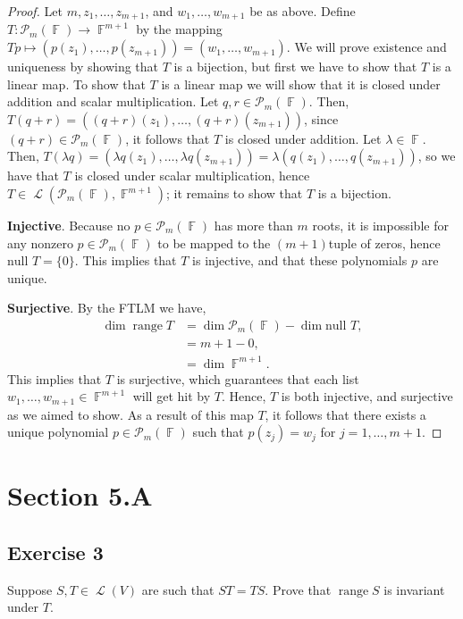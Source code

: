 \documentclass[letterpaper, 12pt]{amsart}
\DeclareMathOperator{\F}{\mathbb{F}}				%
\DeclareMathOperator{\Ell}{\mathscr{L}}				%
\renewcommand{\null}{\text{null }}					%
\DeclareMathOperator{\range}{\text{range }}			%
\theoremstyle{definition}  							%
\begin{document}
		\begin{proof}
		Let $m, z_{1}, \dots, z_{m+1}$, and $w_{1}, \dots, w_{m+1}$ be as above.
		Define $T : \mathcal{P}_{m}(\F) \to \F^{m+1}$ by the mapping $Tp \mapsto (p(z_{1}), \dots, p(z_{m+1})) = (w_{1}, \dots, w_{m+1})$.
		We will prove existence and uniqueness by showing that $T$ is a bijection, but first we have to show that $T$ is a linear map.
		To show that $T$ is a linear map we will show that it is closed under addition and scalar multiplication.
		Let $q,r \in \mathcal{P}_{m}(\F)$.
		Then, $T(q+r) = ((q+r)(z_{1}), \dots, (q+r)(z_{m+1}))$, since $(q+r) \in \mathcal{P}_{m}(\F)$, it follows that $T$ is closed under addition.
		Let $\lambda \in \F$.
		Then, $T(\lambda q) = (\lambda q(z_{1}), \dots, \lambda q(z_{m+1})) = \lambda (q(z_{1}), \dots, q(z_{m+1}))$, so we have that $T$ is closed under scalar multiplication, hence $T \in \Ell(\mathcal{P}_{m}(\F), \F^{m+1})$; it remains to show that $T$ is a bijection.

		\textbf{Injective}.
		Because no $p \in \mathcal{P}_{m}(\F)$ has more than $m$ roots, it is impossible for any nonzero $p \in \mathcal{P}_{m}(\F)$ to be mapped to the $(m+1)$tuple of zeros, hence $\null T = \{ 0 \}$.
		This implies that $T$ is injective, and that these polynomials $p$ are unique.

		\textbf{Surjective}.
		By the FTLM we have,
		\begin{align*}
			\dim \range T &= \dim \mathcal{P}_{m}(\F) - \dim \null T, \\
			&= m + 1 - 0, \\
			&= \dim \F^{m+1}.
		\end{align*}
		This implies that $T$ is surjective, which guarantees that each list $w_{1},\dots,w_{m+1} \in \F^{m+1}$ will get hit by $T$.
		Hence, $T$ is both injective, and surjective as we aimed to show.
		As a result of this map $T$, it follows that there exists a unique polynomial $p \in \mathcal{P}_{m}(\F)$ such that $p(z_{j}) = w_{j}$ for $j = 1, \dots, m+1$.	
		\end{proof}

	\section*{Section 5.A}
		\subsection*{Exercise 3}
		Suppose $S,T \in \Ell(V)$ are such that $ST = TS$. 
		Prove that $\range S$ is invariant under $T$.
\end{document}
